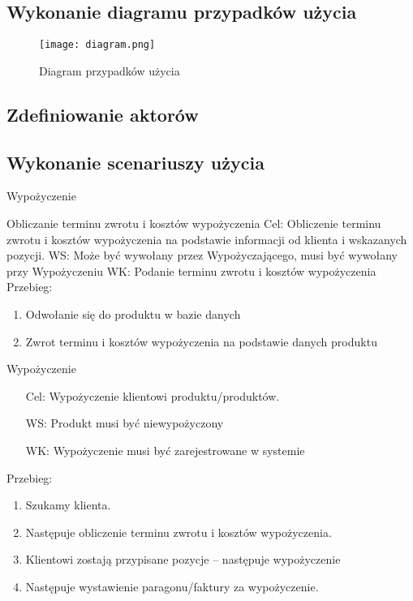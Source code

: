 \documentclass{article}
\begin{document}
	\subsection{Wykonanie diagramu przypadków użycia}
	
\begin{figure}
	\centering
	\texttt{[image: diagram.png]}
	\caption{Diagram przypadków użycia}
	\label{fig:obrazek 1}
\end{figure}
	\subsection{Zdefiniowanie aktorów}
	\subsection{Wykonanie scenariuszy użycia}	
	
\LARGE 	Wypożyczenie  \par 
\Large	Obliczanie terminu zwrotu i kosztów wypożyczenia \newline
\normalsize	Cel: Obliczenie terminu zwrotu i kosztów wypożyczenia na podstawie informacji od klienta i wskazanych pozycji.\newline
	WS: Może być wywołany przez Wypożyczającego, musi być wywołany przy Wypożyczeniu \newline
	WK: Podanie terminu zwrotu i kosztów wypożyczenia\newline
	Przebieg:
\begin{enumerate}
	\item Odwołanie się do produktu w bazie danych
	\item Zwrot terminu i kosztów wypożyczenia na podstawie danych produktu
\end{enumerate}


\Large Wypożyczenie
\normalsize
\begin{enumerate}
	\item[Cel:] Wypożyczenie klientowi produktu/produktów. 
	\item[WS:] Produkt musi być niewypożyczony 
	\item[WK:] Wypożyczenie musi być zarejestrowane w systemie 
\end{enumerate}

Przebieg:
	\begin{enumerate}
		\item Szukamy klienta.
		\item Następuje obliczenie terminu zwrotu i kosztów wypożyczenia.
		\item Klientowi zostają przypisane pozycje – następuje wypożyczenie
		\item Następuje wystawienie paragonu/faktury za wypożyczenie.
	\end{enumerate}
\end{document}
